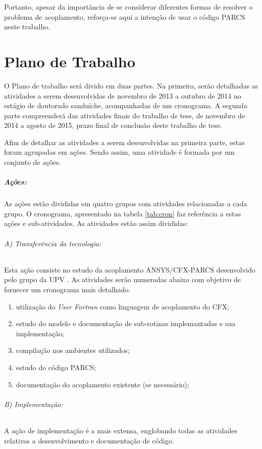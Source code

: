 \documentclass[12pt,openright,twoside,a4paper,english,french,spanish,brazil]{abntex2}
\begin{document}
Portanto, apesar da importância de se considerar diferentes formas de resolver o problema de 
acoplamento, reforça-se aqui a intenção de usar o código PARCS neste trabalho.

\chapter{Plano de Trabalho}

O Plano de trabalho será divido em duas partes. Na primeira, serão detalhadas as atividades a serem desenvolvidas de novembro de 2013 a outubro de 
2014 no estágio de doutorado sanduíche, acompanhadas de um cronograma. A segunda parte compreenderá das atividades finais do trabalho de tese, de novembro de 2014 a agosto de 2015, prazo final de conclusão deste trabalho de tese. 

Afim de detalhar as atividades a serem desenvolvidas na primeira parte, estas foram agrupadas em ações. Sendo assim, uma atividade é formada por um conjunto de ações.
\paragraph*{Ações:} 

As ações estão divididas em quatro grupos com atividades relacionadas a cada grupo. O cronograma, apresentado na tabela \ref{tab:cron} faz referência a estas ações e sub-atividades. As atividades estão assim divididas:

\subparagraph{A) Transferência da tecnologia:}

Esta ação consiste no estudo da acoplamento ANSYS/CFX-PARCS desenvolvido pelo grupo da UPV \cite{Monferrer2011a}. 
As atividades serão numeradas abaixo com objetivo 
de fornecer um cronograma mais detalhado.

\begin{enumerate}
\item utilização 
do \textit{User Fortran} \cite{ANSYS2012} como linguagem de acoplamento do CFX;
\item estudo do modelo e documentação de sub-rotinas implemantadas e sua implementação;
\item compilação nos ambientes utilizados;
\item estudo do código PARCS;
\item documentação do acoplamento existente (se necessário);
\end{enumerate}

\subparagraph{B) Implementação:}

A ação de implementação é a mais extensa, englobando todas as atividades relativas a 
desenvolvimento e documentação de código.
\end{document}
